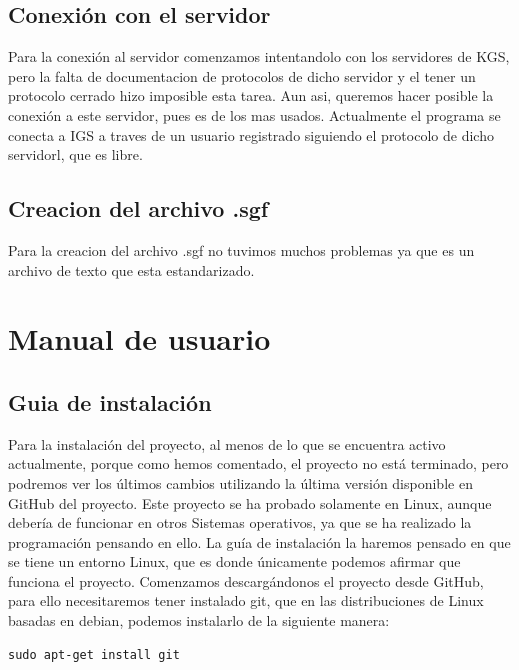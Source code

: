\documentclass[12pt,a4paper]{report}
\begin{document}
 


\section{Conexión con el servidor}

Para la conexión al servidor comenzamos intentandolo con los servidores de KGS,
pero la falta de documentacion de protocolos de dicho servidor y el tener un
protocolo cerrado hizo imposible esta tarea. Aun asi, queremos hacer posible la
conexión a este servidor, pues es de los mas usados. Actualmente el programa se
conecta a IGS a traves de un usuario registrado siguiendo el protocolo de dicho
servidorl, que es libre.



\section{Creacion del archivo .sgf}

Para la creacion del archivo .sgf no tuvimos muchos problemas ya que es un archivo de texto
que esta estandarizado.



\chapter{Manual de usuario}

\section{Guia de instalación} 

Para la instalación del proyecto, al menos de lo que se encuentra activo
actualmente, porque como hemos comentado, el proyecto no está terminado, pero
podremos ver los últimos cambios utilizando la última versión disponible en
GitHub del proyecto. Este proyecto se ha probado solamente en Linux, aunque
debería de funcionar en otros Sistemas operativos, ya que se ha realizado la
programación pensando en ello. 
La guía de instalación la haremos pensado en que se tiene un entorno Linux, que
es donde únicamente podemos afirmar que funciona el proyecto. Comenzamos
descargándonos el proyecto desde GitHub, para ello necesitaremos tener instalado
git, que en las distribuciones de Linux basadas en debian, podemos instalarlo de
la siguiente manera: 

\begin{verbatim}
sudo apt-get install git
\end{verbatim}
\end{document}
